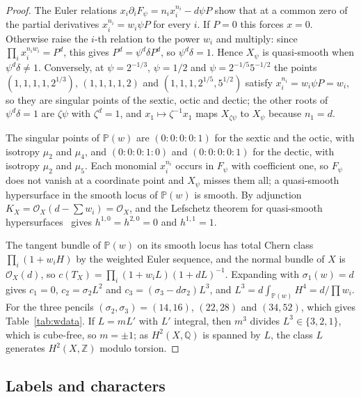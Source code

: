 \documentclass[11pt]{amsart}
\theoremstyle{definition}
\theoremstyle{remark}
\newcommand{\Z}{\mathbb{Z}}
\newcommand{\Q}{\mathbb{Q}}
\newcommand{\PP}{\mathbb{P}}
\newcommand{\cO}{\mathcal{O}}
\begin{document}
\begin{proof}
The Euler relations $x_i\partial_iF_\psi=n_ix_i^{n_i}-d\psi P$ show that at a
common zero of the partial derivatives $x_i^{n_i}=w_i\psi P$ for every $i$.
If $P=0$ this forces $x=0$. Otherwise raise the $i$-th relation to the power
$w_i$ and multiply: since $\prod_ix_i^{n_iw_i}=P^d$, this gives
$P^d=\psi^d\delta P^d$, so $\psi^d\delta=1$. Hence $X_\psi$ is quasi-smooth
when $\psi^d\delta\ne1$. Conversely, at $\psi=2^{-1/3}$, $\psi=1/2$ and
$\psi=2^{-1/5}5^{-1/2}$ the points $(1,1,1,1,2^{1/3})$, $(1,1,1,1,2)$ and
$(1,1,1,2^{1/5},5^{1/2})$ satisfy $x_i^{n_i}=w_i\psi P=w_i$, so they are
singular points of the sextic, octic and dectic; the other roots of
$\psi^d\delta=1$ are $\zeta\psi$ with $\zeta^d=1$, and
$x_1\mapsto\zeta^{-1}x_1$ maps $X_{\zeta\psi}$ to $X_\psi$ because $n_1=d$.

The singular points of $\PP(w)$ are $(0{:}0{:}0{:}0{:}1)$ for the sextic
and the octic, with isotropy $\mu_2$ and $\mu_4$, and $(0{:}0{:}0{:}1{:}0)$
and $(0{:}0{:}0{:}0{:}1)$ for the dectic, with isotropy $\mu_2$ and $\mu_5$.
Each monomial $x_i^{n_i}$ occurs in $F_\psi$ with coefficient one, so $F_\psi$
does not vanish at a coordinate point and $X_\psi$ misses them all; a
quasi-smooth hypersurface in the smooth locus of $\PP(w)$ is smooth. By
adjunction $K_X=\cO_X(d-\sum w_i)=\cO_X$, and the Lefschetz theorem for
quasi-smooth hypersurfaces~\cite{Dol82} gives $h^{1,0}=h^{2,0}=0$ and
$h^{1,1}=1$.

The tangent bundle of $\PP(w)$ on its smooth locus has total Chern class
$\prod_i(1+w_iH)$ by the weighted Euler sequence, and the normal bundle of
$X$ is $\cO_X(d)$, so $c(T_X)=\prod_i(1+w_iL)(1+dL)^{-1}$. Expanding with
$\sigma_1(w)=d$ gives $c_1=0$, $c_2=\sigma_2L^2$ and
$c_3=(\sigma_3-d\sigma_2)L^3$, and $L^3=d\int_{\PP(w)}H^4=d/\prod w_i$. For
the three pencils $(\sigma_2,\sigma_3)=(14,16)$, $(22,28)$ and $(34,52)$,
which gives Table~\ref{tab:wdata}. If $L=mL'$ with $L'$ integral, then
$m^3$ divides $L^3\in\{3,2,1\}$, which is cube-free, so $m=\pm1$; as
$H^2(X,\Q)$ is spanned by $L$, the class $L$ generates $H^2(X,\Z)$ modulo
torsion.
\end{proof}

\subsection{Labels and characters}
\end{document}
